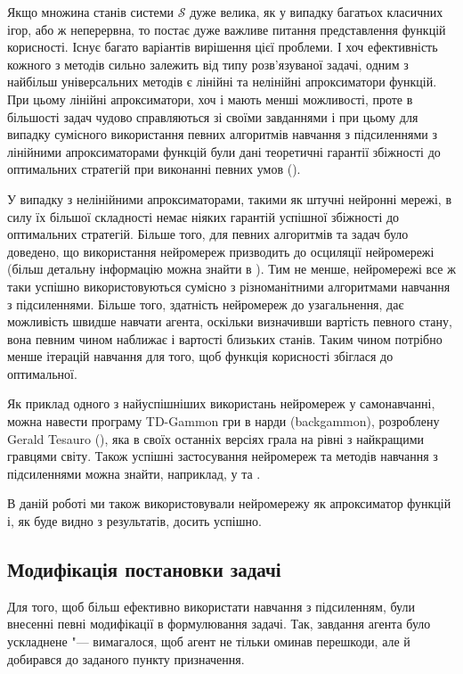 \documentclass[a4paper,10pt,fleqn,draft]{article}
\begin{document}
Якщо множина станів системи $\mathcal{S}$ дуже велика, як у випадку багатьох класичних ігор, або ж неперервна, то постає дуже важливе питання представлення функцій корисності. Існує багато варіантів вирішення цієї проблеми. І хоч ефективність кожного з методів сильно залежить від типу розв'язуваної задачі, одним з найбільш універсальних методів є лінійні та нелінійні апроксиматори функцій. При цьому лінійні апроксиматори, хоч і мають менші можливості, проте в більшості задач чудово справляються зі своїми завданнями і при цьому для випадку сумісного використання певних алгоритмів навчання з підсиленнями з лінійними апроксиматорами функцій були дані теоретичні гарантії збіжності до оптимальних стратегій при виконанні певних умов (\cite{Coulom2002}).

У випадку з нелінійними апроксиматорами, такими як штучні нейронні мережі, в силу їх більшої складності немає ніяких гарантій успішної збіжності до оптимальних стратегій. Більше того, для певних алгоритмів та задач було доведено, що використання нейромереж призводить до осциляції нейромережі (більш детальну інформацію можна знайти в \cite{SuttonBarto2002}). Тим не менше, нейромережі все ж таки успішно використовуються сумісно з різноманітними алгоритмами навчання з підсиленнями. Більше того, здатність нейромереж до узагальнення, дає можливість швидше навчати агента, оскільки визначивши вартість певного стану, вона певним чином наближає і вартості близьких станів. Таким чином потрібно менше ітерацій навчання для того, щоб функція корисності збіглася до оптимальної.

Як приклад одного з найуспішніших використань нейромереж у самонавчанні, можна навести програму TD-Gammon гри в нарди (backgammon), розроблену Gerald Tesauro (\cite{Tesauro1995}), яка в своїх останніх версіях грала на рівні з найкращими гравцями світу. Також успішні застосування нейромереж та методів навчання з підсиленнями можна знайти, наприклад, у \cite{Rummery1995} та \cite{Coulom2002}.

В даній роботі ми також використовували нейромережу як апроксиматор функцій і, як буде видно з результатів, досить успішно.

\subsection{Модифікація постановки задачі}

Для того, щоб більш ефективно використати навчання з підсиленням, були внесенні певні модифікації в формулювання задачі. Так, завдання агента було ускладнене "--- вимагалося, щоб агент не тільки оминав перешкоди, але й добирався до заданого пункту призначення.
\end{document}
